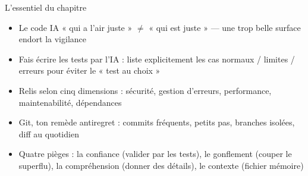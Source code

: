 \begin{tcbsummary}{L'essentiel du chapitre}
\begin{itemize}
  \item Le code IA « qui a l'air juste » $\neq$ « qui est juste » — une trop belle surface endort la vigilance
  \item Fais écrire les tests par l'IA : liste explicitement les cas normaux / limites / erreurs pour éviter le « test au choix »
  \item Relis selon cinq dimensions : sécurité, gestion d'erreurs, performance, maintenabilité, dépendances
  \item Git, ton remède antiregret : commits fréquents, petits pas, branches isolées, diff au quotidien
  \item Quatre pièges : la confiance (valider par les tests), le gonflement (couper le superflu), la compréhension (donner des détails), le contexte (fichier mémoire)
\end{itemize}

\end{tcbsummary}
